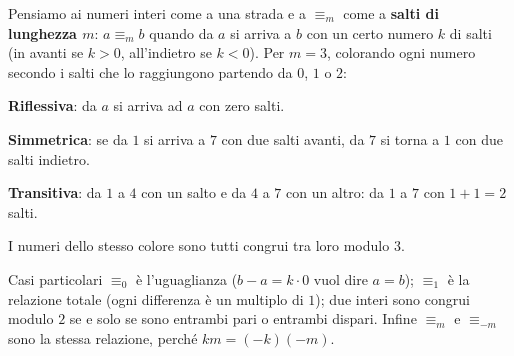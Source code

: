 \begin{spiegazione}
    Pensiamo ai numeri interi come a una strada e a $\equiv_m$ come a \textbf{salti di lunghezza $m$}: $a \equiv_m b$ quando da $a$ si
    arriva a $b$ con un certo numero $k$ di salti (in avanti se $k > 0$, all'indietro se $k < 0$). Per $m = 3$, colorando ogni
    numero secondo i salti che lo raggiungono partendo da $0$, $1$ o $2$:
    \begin{center}
    \end{center}
    \begin{passi}
        \item \textbf{Riflessiva}: da $a$ si arriva ad $a$ con zero salti.
        \item \textbf{Simmetrica}: se da $1$ si arriva a $7$ con due salti avanti, da $7$ si torna a $1$ con due salti indietro.
        \item \textbf{Transitiva}: da $1$ a $4$ con un salto e da $4$ a $7$ con un altro: da $1$ a $7$ con $1 + 1 = 2$ salti.
    \end{passi}
    I numeri dello stesso colore sono tutti congrui tra loro modulo $3$.
\end{spiegazione}

\begin{esempio}{Casi particolari}
    $\equiv_0$ è l'uguaglianza ($b - a = k \cdot 0$ vuol dire $a = b$); $\equiv_1$ è la relazione totale (ogni differenza è un
    multiplo di $1$); due interi sono congrui modulo $2$ se e solo se sono entrambi pari o entrambi dispari. Infine
    $\equiv_m$ e $\equiv_{-m}$ sono la stessa relazione, perché $km = (-k)(-m)$.
\end{esempio}

